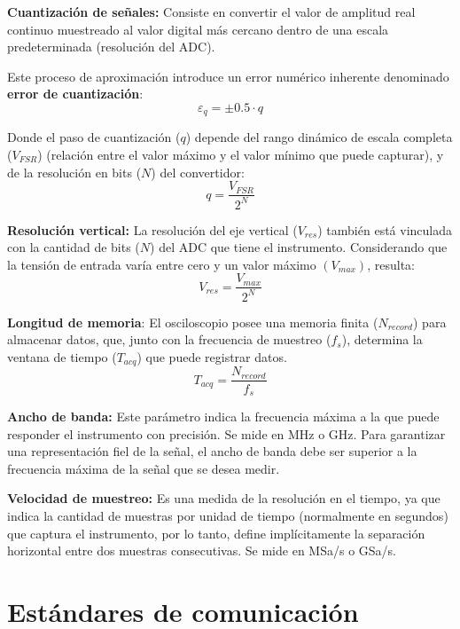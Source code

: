 \textbf{Cuantización de señales:} Consiste en convertir el valor de amplitud real continuo muestreado al valor digital más cercano dentro de una escala predeterminada (resolución del ADC).

Este proceso de aproximación introduce un error numérico inherente denominado \textbf{error de cuantización}:
\begin{equation}
    \varepsilon_q = \pm 0.5 \cdot q 
\end{equation}

Donde el paso de cuantización ($q$) depende del rango dinámico de escala completa ($V_{FSR}$) (relación entre el valor máximo y el valor mínimo que puede capturar), y de la resolución en bits ($N$) del convertidor:
\begin{equation}
    q = \dfrac{V_{FSR}}{2^N}
\end{equation}

\textbf{Resolución vertical:} La resolución del eje vertical ($V_{res}$) también está vinculada con la cantidad de bits ($N$) del ADC que tiene el instrumento. Considerando que la tensión de entrada varía entre cero y un valor máximo $(V_{max})$, resulta:
\begin{equation}
    V_{res} = \dfrac{V_{max}}{2^N}
\end{equation}

\textbf{Longitud de memoria}: El osciloscopio posee una memoria finita ($N_{record}$) para almacenar datos, que, junto con la frecuencia de muestreo ($f_s$), determina la ventana de tiempo ($T_{acq}$) que puede registrar datos.
\begin{equation}
    T_{acq} = \dfrac{N_{record}}{f_s}
\end{equation}

\textbf{Ancho de banda:} Este parámetro indica la frecuencia máxima a la que puede responder el instrumento con precisión. Se mide en \unit{MHz} o \unit{GHz}. Para garantizar una representación fiel de la señal, el ancho de banda debe ser superior a la frecuencia máxima de la señal que se desea medir.

\textbf{Velocidad de muestreo:} Es una medida de la resolución en el tiempo, ya que indica la cantidad de muestras por unidad de tiempo (normalmente en segundos) que captura el instrumento, por lo tanto, define implícitamente la separación horizontal entre dos muestras consecutivas. Se mide en \unit{MSa/s} o \unit{GSa/s}.

\section{Estándares de comunicación}
\vspace{3\baselineskip}

